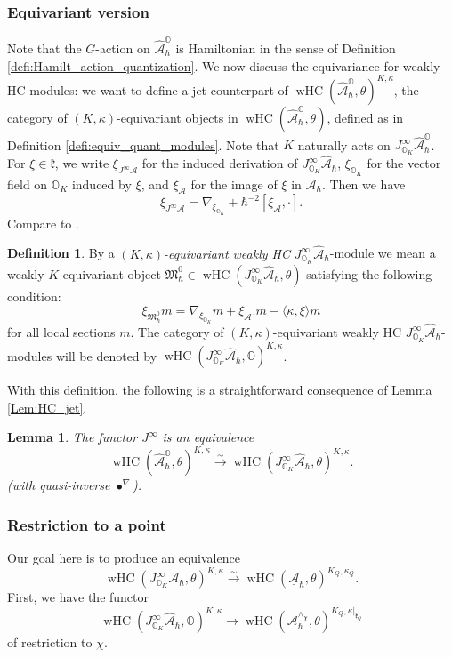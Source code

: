 \documentclass[12pt]{amsart}
\newcommand{\A}{\mathcal{A}}
\newcommand{\Orb}{\mathbb{O}}
\newcommand{\kf}{\mathfrak{k}}
\newcommand{\jet}{J^\infty}
\newcommand{\wHC}{\operatorname{wHC}}
\newtheorem{Lem}[Thm]{Lemma}
\theoremstyle{definition}
\newtheorem{defi}[Thm]{Definition}
\numberwithin{equation}{section}
\begin{document}
\subsubsection{Equivariant version}\label{SSS_equiv_jets}
Note that the $G$-action on $\hat{\A}_\hbar^{\Orb}$ is Hamiltonian in the sense of
Definition \ref{defi:Hamilt_action_quantization}.
We now discuss the equivariance for weakly HC modules: we want to define a jet counterpart of $\wHC(\hat{\A}_\hbar^\Orb,\theta)^{K,\kappa}$, the category of $(K,\kappa)$-equivariant
objects in $\wHC(\hat{\A}_\hbar^\Orb,\theta)$, defined as in Definition \ref{defi:equiv_quant_modules}. Note that $K$ naturally acts on $\jet_{\Orb_K}\hat{\A}_\hbar^\Orb$.
For $\xi\in \kf$, we write $\xi_{\jet\A}$ for the induced derivation of
$\jet_{\Orb_K}\hat{\A}_\hbar$, $\xi_{\Orb_K}$ for the vector field on $\Orb_K$
induced by $\xi$, and $\xi_{\A}$ for the image of $\xi$ in $\A_\hbar$. Then we have
\begin{equation}\label{eq:deriv_equation}
\xi_{\jet\A}=\nabla_{\xi_{\Orb_K}}+\hbar^{-2}[\xi_{\A},\cdot].
\end{equation}
Compare to \cite[(3.1)]{1dim_quant}.

\begin{defi}\label{defi:wHC_jet_equiv}
By a {\it $(K,\kappa)$-equivariant weakly HC} $\jet_{\Orb_K}\hat{\A}_\hbar$-module
we mean a weakly $K$-equivariant object $\mathfrak{M}^0_\hbar\in \wHC(\jet_{\Orb_K}\hat{\A}_\hbar,\theta)$
satisfying the following condition:
\begin{equation}\label{eq:jet_equiv}
\xi_{\mathfrak{M}^0_\hbar}m=\nabla_{\xi_{\Orb_K}}m+\xi_{\A}.m-\langle\kappa,\xi\rangle m
\end{equation}
for all local sections $m$. The category of $(K,\kappa)$-equivariant weakly HC
$\jet_{\Orb_K}\hat{\A}_\hbar$-modules will be denoted by
$\wHC(\jet_{\Orb_K}\hat{\A}_\hbar,\Orb)^{K,\kappa}$.
\end{defi}

With this definition, the following is a straightforward consequence of
Lemma \ref{Lem:HC_jet}.

\begin{Lem}\label{Lem:HC_jet_equiv}
The functor $\jet$ is an equivalence
$$\wHC(\hat{\A}_\hbar^{\Orb},\theta)^{K,\kappa}\xrightarrow{\sim} \wHC(\jet_{\Orb_K}\hat{\A}_\hbar,\theta)^{K,\kappa}.$$
(with quasi-inverse $\bullet^{\nabla}$).
\end{Lem}

\subsubsection{Restriction to a point}\label{SSS_point_restriction}
Our goal here is to produce an equivalence
$$\wHC(\jet_{\Orb_K}\A_\hbar,\theta)^{K,\kappa}\xrightarrow{\sim} \wHC(\underline{\A}_\hbar,\theta)^{K_Q,\kappa_Q}.$$
First, we have the functor
\begin{equation}\label{eq:restr_to_pt}\wHC(\jet_{\Orb_K}\hat{\A}_\hbar,\Orb)^{K,\kappa}\rightarrow
\wHC(\A_\hbar^{\wedge_\chi},\theta)^{K_Q,\kappa|_{\kf_Q}}
\end{equation}
of restriction to $\chi$.
\end{document}
